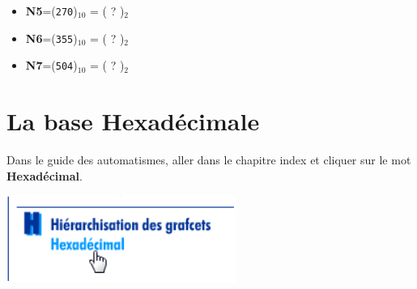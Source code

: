 \documentclass{article}
\begin{document}
\begin{enumerate}
\begin{itemize}
\vspace{1em}
\begin{Form}
	\TextField[name=r104,width=\linewidth,height=2.5em,multiline=true,default=N4=]{}
\end{Form}
			\item \textbf{N5}=(\texttt{270})$_{10}$ = ( ? )$_{2}$\\
\vspace{1em}
\begin{Form}
	\TextField[name=r105,width=\linewidth,height=2.5em,multiline=true,default=N5=]{}
\end{Form}
			\item \textbf{N6}=(\texttt{355})$_{10}$ = ( ? )$_{2}$\\
\vspace{1em}
\begin{Form}
	\TextField[name=r106,width=\linewidth,height=2.5em,multiline=true,default=N6=]{}
\end{Form}
			\item \textbf{N7}=(\texttt{504})$_{10}$ = ( ? )$_{2}$\\
\vspace{1em}
\begin{Form}
	\TextField[name=r107,width=\linewidth,height=2.5em,multiline=true,default=N7=]{}
\end{Form}
		\end{itemize}
\end{enumerate}

\section{La base Hexadécimale}
Dans le guide des automatismes, aller dans le chapitre \og{}index\fg{} et cliquer sur le mot \textbf{Hexadécimal}.

\begin{center}
	\includegraphics[width=.3\linewidth]{./figures/gda2.png}
\end{center}
\end{document}
